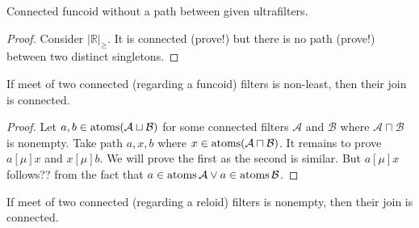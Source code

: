 \begin{example}
  Connected funcoid without a path between given ultrafilters.
\end{example}

\begin{proof}
  Consider $| \mathbb{R} |_{\geq}$. It is connected (prove!) but there is no
  path (prove!) between two distinct singletons.
\end{proof}

\begin{thm}
  If meet of two connected (regarding a funcoid) filters is non-least,
  then their join is connected.
\end{thm}

\begin{proof}
  Let $a, b \in \operatorname{atoms} (\mathcal{A} \sqcup \mathcal{B})$ for some
  connected filters $\mathcal{A}$ and $\mathcal{B}$ where $\mathcal{A} \sqcap
  \mathcal{B}$ is nonempty. Take path $a, x, b$ where $x \in \operatorname{atoms}
  (\mathcal{A} \sqcap \mathcal{B})$. It remains to prove $a \mathrel{[\mu]} x$
  and $x \mathrel{[\mu]} b$. We will prove the first as the second is similar.
  But $a \mathrel{[\mu]} x$ follows?? 
  from the fact that $a \in \operatorname{atoms} \mathcal{A} \vee a \in \operatorname{atoms}
  \mathcal{B}$.
\end{proof}

\begin{thm}
  If meet of two connected (regarding a reloid) filters is nonempty, then
  their join is connected.
\end{thm}

